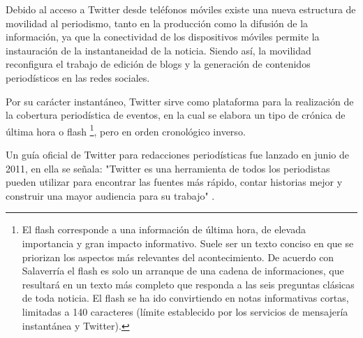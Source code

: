 Debido al acceso a Twitter desde teléfonos móviles existe una nueva estructura de movilidad al periodismo, tanto en la producción como la difusión de la información, ya que la conectividad de los dispositivos móviles permite la instauración de la instantaneidad de la noticia. Siendo así, la movilidad reconfigura el trabajo de edición de blogs y la generación de contenidos periodísticos en las redes sociales. 

Por su carácter instantáneo, Twitter sirve como plataforma para la realización de la cobertura periodística de eventos, en la cual se elabora un tipo de crónica de última hora o flash \footnote{El flash corresponde a una información de última hora, de elevada importancia y gran impacto informativo. Suele ser un texto conciso en que se priorizan los aspectos más relevantes del acontecimiento. De acuerdo con Salaverría el flash es solo un arranque de una cadena de informaciones, que resultará en un texto más completo que responda a las seis preguntas clásicas de toda noticia. El flash se ha ido convirtiendo en notas informativas cortas, limitadas a 140 caracteres (límite establecido por los servicios de mensajería instantánea y Twitter).\cite{salaverria2005redaccion}}, pero en orden cronológico inverso. 

Un guía oficial de Twitter para redacciones periodísticas fue lanzado en junio de 2011, en ella se señala: "Twitter es una herramienta de todos los periodistas pueden utilizar para encontrar las fuentes más rápido, contar historias mejor y construir una mayor audiencia para su trabajo" \cite{tweetsJournalist}.
